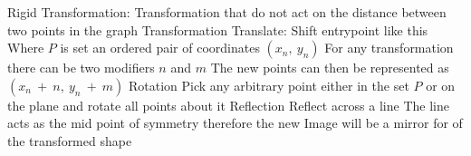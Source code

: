 \documentclass[12pt]{article}
\begin{document}
        \begin{outline}
            \1 Rigid Transformation: Transformation that do not act on the distance between two points in the graph
            \1 Transformation
                \2 Translate: Shift entrypoint like this
                \2 Where $P$ is set an ordered pair of coordinates $(x_n,\ y_n)$
                \2 For any transformation there can be two modifiers $n$ and $m$
                \2 The new points can then be represented as $(x_n\ +\ n,\ y_n\ +\ m)$
            \1 Rotation
                \2 Pick any arbitrary point either in the set $P$ or on the plane and rotate all points about it
            \1 Reflection
                \2 Reflect across a line
                \2 The line acts as the mid point of symmetry therefore the new Image will be a mirror for of the transformed shape

        \end{outline}
\end{document}
